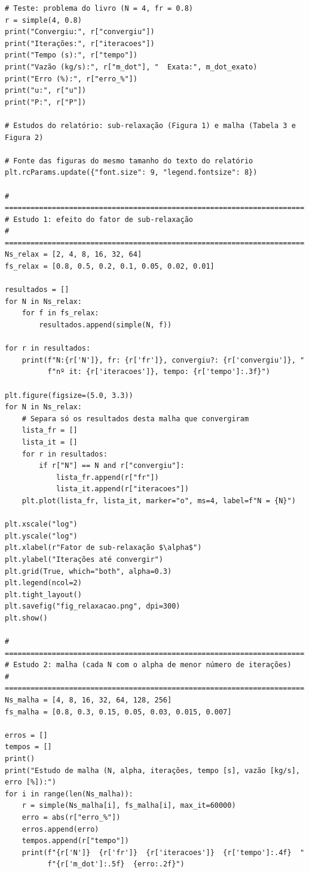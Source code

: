 {\begin{verbatim}
# Teste: problema do livro (N = 4, fr = 0.8)
r = simple(4, 0.8)
print("Convergiu:", r["convergiu"])
print("Iterações:", r["iteracoes"])
print("Tempo (s):", r["tempo"])
print("Vazão (kg/s):", r["m_dot"], "  Exata:", m_dot_exato)
print("Erro (%):", r["erro_%"])
print("u:", r["u"])
print("P:", r["P"])

# Estudos do relatório: sub-relaxação (Figura 1) e malha (Tabela 3 e Figura 2)

# Fonte das figuras do mesmo tamanho do texto do relatório
plt.rcParams.update({"font.size": 9, "legend.fontsize": 8})

# ======================================================================
# Estudo 1: efeito do fator de sub-relaxação
# ======================================================================
Ns_relax = [2, 4, 8, 16, 32, 64]
fs_relax = [0.8, 0.5, 0.2, 0.1, 0.05, 0.02, 0.01]

resultados = []
for N in Ns_relax:
    for f in fs_relax:
        resultados.append(simple(N, f))

for r in resultados:
    print(f"N:{r['N']}, fr: {r['fr']}, convergiu?: {r['convergiu']}, "
          f"nº it: {r['iteracoes']}, tempo: {r['tempo']:.3f}")

plt.figure(figsize=(5.0, 3.3))
for N in Ns_relax:
    # Separa só os resultados desta malha que convergiram
    lista_fr = []
    lista_it = []
    for r in resultados:
        if r["N"] == N and r["convergiu"]:
            lista_fr.append(r["fr"])
            lista_it.append(r["iteracoes"])
    plt.plot(lista_fr, lista_it, marker="o", ms=4, label=f"N = {N}")

plt.xscale("log")
plt.yscale("log")
plt.xlabel(r"Fator de sub-relaxação $\alpha$")
plt.ylabel("Iterações até convergir")
plt.grid(True, which="both", alpha=0.3)
plt.legend(ncol=2)
plt.tight_layout()
plt.savefig("fig_relaxacao.png", dpi=300)
plt.show()

# ======================================================================
# Estudo 2: malha (cada N com o alpha de menor número de iterações)
# ======================================================================
Ns_malha = [4, 8, 16, 32, 64, 128, 256]
fs_malha = [0.8, 0.3, 0.15, 0.05, 0.03, 0.015, 0.007]

erros = []
tempos = []
print()
print("Estudo de malha (N, alpha, iterações, tempo [s], vazão [kg/s], erro [%]):")
for i in range(len(Ns_malha)):
    r = simple(Ns_malha[i], fs_malha[i], max_it=60000)
    erro = abs(r["erro_%"])
    erros.append(erro)
    tempos.append(r["tempo"])
    print(f"{r['N']}  {r['fr']}  {r['iteracoes']}  {r['tempo']:.4f}  "
          f"{r['m_dot']:.5f}  {erro:.2f}")


\end{verbatim}}
